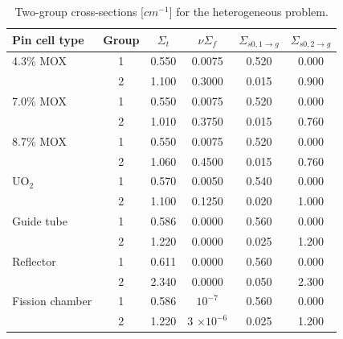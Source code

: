 \documentclass[letterpaper]{article}
\begin{document}
\begin{table}[htbp!]
\centering
\caption{Two-group cross-sections [$cm^{-1}$] for the heterogeneous problem.}
\begin{tabular}{lccccc}
\toprule
Pin cell type & Group & $\Sigma_t$ & $\nu \Sigma_f$ & $\Sigma_{s0, 1 \rightarrow g}$ & $\Sigma_{s0, 2 \rightarrow g}$ \\
\midrule
4.3\% MOX       & 1     & 0.550      & 0.0075         & 0.520                         & 0.000                         \\
                & 2     & 1.100      & 0.3000         & 0.015                         & 0.900                         \\

7.0\% MOX       & 1     & 0.550      & 0.0075         & 0.520                         & 0.000                         \\
                & 2     & 1.010      & 0.3750         & 0.015                         & 0.760                         \\

8.7\% MOX       & 1     & 0.550      & 0.0075         & 0.520                         & 0.000                         \\
                & 2     & 1.060      & 0.4500         & 0.015                         & 0.760                         \\

UO$_2$          & 1     & 0.570      & 0.0050         & 0.540                         & 0.000                         \\
                & 2     & 1.100      & 0.1250         & 0.020                         & 1.000                         \\

Guide tube      & 1     & 0.586      & 0.0000         & 0.560                         & 0.000                         \\
                & 2     & 1.220      & 0.0000         & 0.025                         & 1.200                         \\

Reflector       & 1     & 0.611      & 0.0000         & 0.560                         & 0.000                         \\
                & 2     & 2.340      & 0.0000         & 0.050                         & 2.300                         \\

Fission chamber & 1     & 0.586      & $10^{-7}$      & 0.560                         & 0.000                         \\
                & 2     & 1.220      & 3 $\times 10^{-6}$   & 0.025                   & 1.200                         \\
\bottomrule
\end{tabular}
\label{tab:bench-xs-het}
\end{table}
\end{document}
